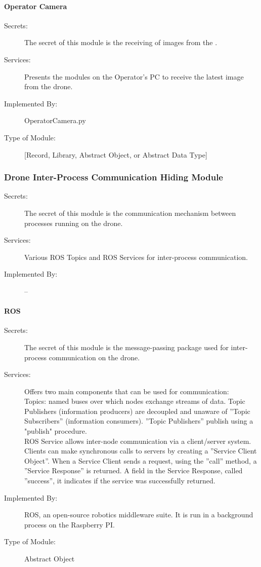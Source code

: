 \documentclass[12pt, titlepage]{article}
\begin{document}
\paragraph{Operator Camera}
\label{Operator Camera}
\begin{description}
\item[Secrets:] The secret of this module is the receiving of images from the .
\item[Services:] Presents the modules on the Operator's PC to receive the latest image from the drone.
\item[Implemented By:] OperatorCamera.py
\item[Type of Module:] [Record, Library, Abstract Object, or Abstract Data Type]
\end{description}

\subsubsection{Drone Inter-Process Communication Hiding Module}
\begin{description}
\item[Secrets:] The secret of this module is the communication mechanism between processes running on the drone.
\item[Services:] Various ROS Topics and ROS Services for inter-process communication.
\item[Implemented By:] --
\end{description}

\paragraph{ROS}
\label{ROS}
\begin{description}
\item[Secrets:] The secret of this module is the message-passing package used for inter-process communication on the drone. 
\item[Services:] Offers two main components that can be used for communication: \\
Topics: named buses over which nodes exchange streams of data. Topic Publishers (information producers) are decoupled and unaware of ''Topic Subscribers'' (information consumers). ''Topic Publishers'' publish using a "publish" procedure. \\
 ROS Service allows inter-node communication via a client/server system. Clients can make  synchronous calls to servers by creating a ''Service Client Object''.  When a Service Client sends a request, using the ''call'' method, a ''Service Response'' is returned. A field in the Service Response, called ''success'', it indicates if the service was successfully returned.
\item[Implemented By:] ROS, an open-source robotics middleware suite. It is run in a background process on the Raspberry PI.
\item[Type of Module:] Abstract Object
\end{description}
\end{document}
